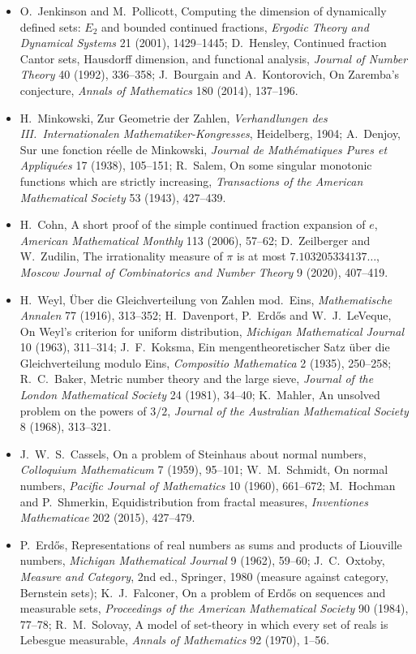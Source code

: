 \begin{itemize}
{Theory and Information}, Wiley, 1965.
\item O.~Jenkinson and M.~Pollicott, Computing the dimension of dynamically defined sets: $E_2$ and bounded continued fractions, \emph{Ergodic Theory and Dynamical Systems} 21
(2001), 1429--1445; D.~Hensley, Continued fraction Cantor sets, Hausdorff dimension, and functional analysis, \emph{Journal of Number Theory} 40 (1992), 336--358;
J.~Bourgain and A.~Kontorovich, On Zaremba's conjecture, \emph{Annals of Mathematics} 180 (2014), 137--196.
\item H.~Minkowski, Zur Geometrie der Zahlen, \emph{Verhandlungen des III.\ Internationalen Mathematiker-Kongresses}, Heidelberg, 1904; A.~Denjoy, Sur une fonction réelle
de Minkowski, \emph{Journal de Mathématiques Pures et Appliquées} 17 (1938), 105--151; R.~Salem, On some singular monotonic functions which are strictly increasing,
\emph{Transactions of the American Mathematical Society} 53 (1943), 427--439.
\item H.~Cohn, A short proof of the simple continued fraction expansion of $e$, \emph{American Mathematical Monthly} 113 (2006), 57--62; D.~Zeilberger and W.~Zudilin, The
irrationality measure of $\pi$ is at most $7.103205334137\ldots$, \emph{Moscow Journal of Combinatorics and Number Theory} 9 (2020), 407--419.
\item H.~Weyl, Über die Gleichverteilung von Zahlen mod.\ Eins, \emph{Mathematische Annalen} 77 (1916), 313--352; H.~Davenport, P.~Erdős and W.~J.~LeVeque, On Weyl's criterion
for uniform distribution, \emph{Michigan Mathematical Journal} 10 (1963), 311--314; J.~F.~Koksma, Ein mengentheoretischer Satz über die Gleichverteilung modulo Eins,
\emph{Compositio Mathematica} 2 (1935), 250--258; R.~C.~Baker, Metric number theory and the large sieve, \emph{Journal of the London Mathematical Society} 24 (1981), 34--40;
K.~Mahler, An unsolved problem on the powers of $3/2$, \emph{Journal of the Australian Mathematical Society} 8 (1968), 313--321.
\item J.~W.~S.~Cassels, On a problem of Steinhaus about normal numbers, \emph{Colloquium Mathematicum} 7 (1959), 95--101; W.~M.~Schmidt, On normal numbers, \emph{Pacific
Journal of Mathematics} 10 (1960), 661--672; M.~Hochman and P.~Shmerkin, Equidistribution from fractal measures, \emph{Inventiones Mathematicae} 202 (2015), 427--479.
\item P.~Erdős, Representations of real numbers as sums and products of Liouville numbers, \emph{Michigan Mathematical Journal} 9 (1962), 59--60; J.~C.~Oxtoby, \emph{Measure
and Category}, 2nd ed., Springer, 1980 (measure against category, Bernstein sets); K.~J.~Falconer, On a problem of Erdős on sequences and measurable sets, \emph{Proceedings of
the American Mathematical Society} 90 (1984), 77--78; R.~M.~Solovay, A model of set-theory in which every set of reals is Lebesgue measurable, \emph{Annals of Mathematics} 92
(1970), 1--56.
\end{itemize}
